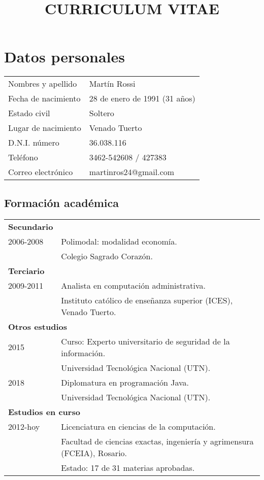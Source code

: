 \documentclass[12pt]{article}
\title{\huge{\textbf{CURRICULUM VITAE}}\vspace{-3ex}}
\date{}
\begin{document}
\maketitle
\section*{Datos personales}
\bgroup
\def\arraystretch{1.25}
\begin{tabular}{p{5cm} l}
  Nombres y apellido&Martín Rossi\\
  Fecha de nacimiento&28 de enero de 1991 (31 años)\\
  Estado civil&Soltero\\
  Lugar de nacimiento&Venado Tuerto\\
  D.N.I. número&36.038.116\\
  Teléfono&3462-542608 / 427383\\
  Correo electrónico&martinros24@gmail.com\\
\end{tabular}
\setlength{\unitlength}{0.5cm}
\subsection*{Formación académica}
\begin{tabular}{l l}
  \multicolumn{1}{l}{\textbf{Secundario}}\\
  2006-2008&Polimodal: modalidad economía.\\
           &\small{Colegio Sagrado Corazón.}\\
  \multicolumn{2}{l}{\textbf{Terciario}}\\
  2009-2011&Analista en computación administrativa.\\
           &\small{Instituto católico de enseñanza superior (ICES), Venado Tuerto.}\\
  \multicolumn{2}{l}{\textbf{Otros estudios}}\\
  2015&Curso: Experto universitario de seguridad de la información.\\
           &\small{Universidad Tecnológica Nacional (UTN).}\\
  2018&Diplomatura en programación Java.\\
           &\small{Universidad Tecnológica Nacional (UTN).}\\
  \multicolumn{2}{l}{\textbf{Estudios en curso}}\\
  2012-hoy&Licenciatura en ciencias de la computación.\\
           &\small{Facultad de ciencias exactas, ingeniería y agrimensura (FCEIA), Rosario.}\\
           &\small{Estado: 17 de 31 materias aprobadas.}\\
\end{tabular}
\end{document}
